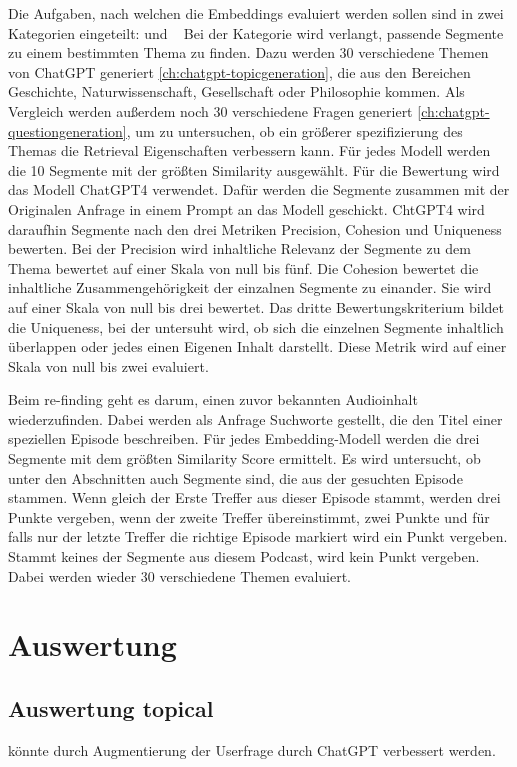 Die Aufgaben, nach welchen die Embeddings evaluiert werden sollen sind in zwei Kategorien eingeteilt:
 und ~\cite{jones2021}
Bei der Kategorie  wird verlangt, passende Segmente zu einem bestimmten Thema zu finden.
Dazu werden 30 verschiedene Themen von ChatGPT generiert \ref{ch:chatgpt-topicgeneration}, die aus den Bereichen Geschichte, Naturwissenschaft, Gesellschaft oder Philosophie kommen.
Als Vergleich werden außerdem noch 30 verschiedene Fragen generiert \ref{ch:chatgpt-questiongeneration}, um zu untersuchen, ob ein größerer spezifizierung des Themas die Retrieval Eigenschaften verbessern kann. 
Für jedes Modell werden die 10 Segmente mit der größten Similarity ausgewählt.
Für die Bewertung wird das Modell ChatGPT4 verwendet.
Dafür werden die Segmente zusammen mit der Originalen Anfrage in einem Prompt an das Modell geschickt.
ChtGPT4 wird daraufhin Segmente nach den drei Metriken Precision, Cohesion und Uniqueness bewerten.
Bei der Precision wird inhaltliche Relevanz der Segmente zu dem Thema bewertet auf einer Skala von  null bis fünf.
Die Cohesion bewertet die inhaltliche Zusammengehörigkeit der einzalnen Segmente zu einander.
Sie wird auf einer Skala von null bis drei bewertet.
Das dritte Bewertungskriterium bildet die Uniqueness, bei der untersuht wird, ob sich die einzelnen Segmente inhaltlich überlappen oder jedes einen Eigenen Inhalt darstellt.
Diese Metrik wird auf einer Skala von null bis zwei evaluiert.


Beim re-finding geht es darum, einen zuvor bekannten Audioinhalt wiederzufinden.
Dabei werden als Anfrage Suchworte gestellt, die den Titel einer speziellen Episode beschreiben.
Für jedes Embedding-Modell werden die drei Segmente mit dem größten Similarity Score ermittelt.
Es wird untersucht, ob unter den Abschnitten auch Segmente sind, die aus der gesuchten Episode stammen.
Wenn gleich der Erste Treffer aus dieser Episode stammt, werden drei Punkte vergeben, wenn der zweite Treffer übereinstimmt, zwei Punkte und für falls nur der letzte Treffer die richtige Episode markiert wird ein Punkt vergeben.
Stammt keines der Segmente aus diesem Podcast, wird kein Punkt vergeben.
Dabei werden wieder 30 verschiedene Themen evaluiert.


\section{Auswertung}

\subsection{Auswertung topical}




könnte durch Augmentierung der Userfrage durch ChatGPT verbessert werden.\cite{shum2024}\cite{dai2023}